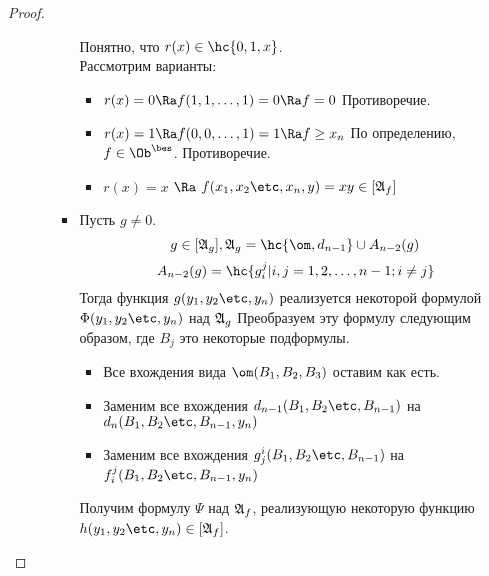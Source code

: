 \documentclass[unicode, 10pt, a4paper, oneside, fleqn]{article}
\begin{document}
\begin{proof}
\begin{itemize}
\begin{itemize}
\begin{itemize}
\begin{denote}
              \end{denote}
              Понятно, что $r(x) \in \hc{0, 1, x}$.\\
              Рассмотрим варианты:
              \begin{itemize}
                \item 
                  \begin{math}
                    r(x) = 0 \Ra f(1,1,\ldots,1) = 0 \Ra f=0
                  \end{math}
                  Противоречие.
                \item 
                  \begin{math}
                    r(x) = 1 \Ra f(0,0,\ldots,1) = 1 \Ra f\ge x_n
                  \end{math}
                  По определению, $f \in \Oib$. Противоречие.
                \item $r(x) = x$ $\Ra$  $ f(\set[x]{n},y) = xy \in [\ag_f]$
              \end{itemize}
            \item Пусть $g \ne 0$. \WHY 
              \begin{displaymath}
                g \in [\ag_g], \ag_g=\hc{\om, d_{n-1}}\cup A_{n-2}(g)
              \end{displaymath}
              \begin{displaymath}
                A_{n-2}(g) = \hc{ g_i^j |i,j=1,2,\ldots,n-1; i\ne j }
              \end{displaymath}
              Тогда функция $g(\set[y]{n})$ реализуется некоторой формулой  $\Phi(\set[y]{n})$ над $\mathfrak{A}_g$
              Преобразуем эту формулу следующим образом, где $B_j$ это некоторые подформулы.
              \begin{itemize}
                \item Все вхождения вида $\om(B_1,B_2,B_3)$ оставим как есть.
                \item Заменим все вхождения $d_{n-1}(\set[B]{n-1})$ на $d_n(\set[B]{n-1},y_n)$
                \item Заменим все вхождения $g^i_j(\set[B]{n-1})$ на \CHECK $f^j_i(\set[B]{n-1},y_n)$
              \end{itemize}
              Получим формулу $\Psi$ над $\mathfrak{A}_f$, реализующую некоторую функцию $h(\set[y]{n}) \in [\ag_f]$.

\end{itemize}
\end{itemize}
\end{itemize}
\end{proof}
\end{document}
